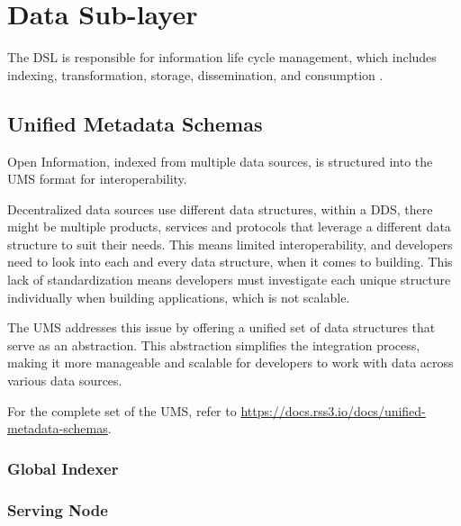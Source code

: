 \section{Data Sub-layer}

The \gls{DSL} is responsible for information life cycle management, which includes indexing, transformation, storage, dissemination, and consumption \cite{nationalinstituteofstandardsandtechnology2016Information}.

\subsection{Unified Metadata Schemas}

Open Information, indexed from multiple data sources, is structured into the \gls{UMS} format for interoperability.

Decentralized data sources use different data structures, within a DDS, there might be multiple products, services and protocols that leverage a different data structure to suit their needs. This means limited interoperability, and developers need to look into each and every data structure, when it comes to building. This lack of standardization means developers must investigate each unique structure individually when building applications, which is not scalable.

The UMS addresses this issue by offering a unified set of data structures that serve as an abstraction. This abstraction simplifies the integration process, making it more manageable and scalable for developers to work with data across various data sources.

For the complete set of the \gls{UMS}, refer to \url{https://docs.rss3.io/docs/unified-metadata-schemas}.


\subsubsection{Global Indexer}

\subsubsection{Serving Node}